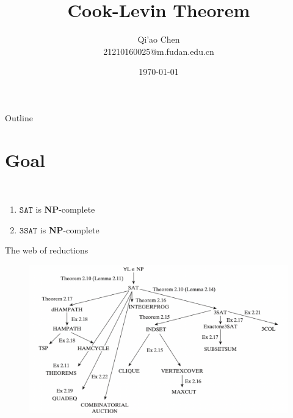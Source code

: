 \documentclass[presentation]{beamer}
\author{Qi'ao Chen\\21210160025@m.fudan.edu.cn}
\date{\today}
\title{Cook-Levin Theorem}
\def \NP {\textbf{NP}}
\def \NP {\textbf{NP}}
\def \SAT {\texttt{SAT}}
\def \TSAT {\texttt{3SAT}}
\begin{document}
\maketitle
\begin{frame}{Outline}
\tableofcontents
\end{frame}

\section{Goal}
\label{sec:orgbaeb2d6}
\begin{frame}[label={sec:orgbbf2329}]{​​}
\begin{theorem}
\begin{enumerate}
\item \(\SAT\) is \(\NP\)-complete
\item \(\TSAT\) is \(\NP\)-complete
\end{enumerate}
\end{theorem}
\end{frame}


\begin{frame}[label={sec:org93a9723}]{The web of reductions}
\begin{figure}[htbp]
\centering
\includegraphics[width=.8\textwidth]{./3.pdf}
\label{}
\end{figure}
\end{frame}
\end{document}
